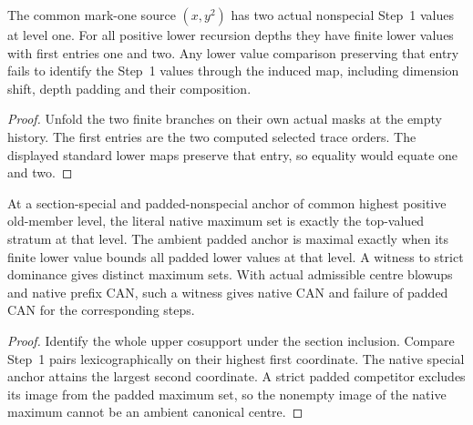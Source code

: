 \begin{theorem}
\label{hir:g1-positive-normal-finite-obstruction}
\leanok
The common mark-one source $(x,y^2)$ has two actual nonspecial
Step~1 values at level one. For all positive lower recursion depths
they have finite lower values with first entries one and two. Any
lower value comparison preserving that entry fails to identify
the Step~1 values through the induced map, including dimension
shift, depth padding and their composition.
\end{theorem}
\begin{proof}
Unfold the two finite branches on their own actual masks at the
empty history. The first entries are the two computed selected
trace orders. The displayed standard lower maps preserve that
entry, so equality would equate one and two.
\end{proof}

\begin{theorem}
\label{hir:g1-positive-normal-branch-centres}
\leanok
At a section-special and padded-nonspecial anchor of common
highest positive old-member level, the literal native maximum set
is exactly the top-valued stratum at that level. The ambient
padded anchor is maximal exactly when its finite lower value
bounds all padded lower values at that level. A witness to strict
dominance gives distinct maximum sets. With actual admissible
centre blowups and native prefix CAN, such a witness gives native
CAN and failure of padded CAN for the corresponding steps.
\end{theorem}
\begin{proof}
Identify the whole upper cosupport under the section inclusion.
Compare Step~1 pairs lexicographically on their highest first
coordinate. The native special anchor attains the largest second
coordinate. A strict padded competitor excludes its image from
the padded maximum set, so the nonempty image of the native
maximum cannot be an ambient canonical centre.
\end{proof}

